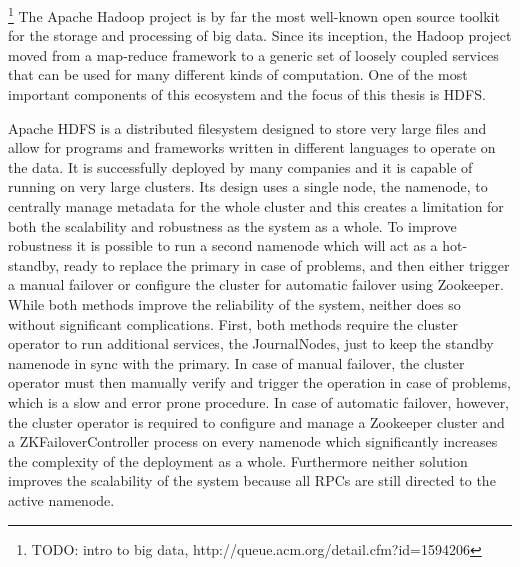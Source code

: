 \footnote{TODO: intro to big data, http://queue.acm.org/detail.cfm?id=1594206}
The Apache Hadoop project is by far the most well-known open source toolkit for the storage and processing of big data.
Since its inception, the Hadoop project moved from a map-reduce framework to a generic set of loosely coupled services that can be used for many different kinds of computation.
One of the most important components of this ecosystem and the focus of this thesis is HDFS.

Apache HDFS is a distributed filesystem designed to store very large files and allow for programs and frameworks written in different languages to operate on the data.
It is successfully deployed by many companies and it is capable of running on very large clusters.
Its design uses a single node, the namenode, to centrally manage metadata for the whole cluster and this creates a limitation for both the scalability and robustness as the system as a whole.
To improve robustness it is possible to run a second namenode which will act as a hot-standby, ready to replace the primary in case of problems, and then either trigger a manual failover or configure the cluster for automatic failover using Zookeeper.
While both methods improve the reliability of the system, neither does so without significant complications.
First, both methods require the cluster operator to run additional services, the JournalNodes, just to keep the standby namenode in sync with the primary.
In case of manual failover, the cluster operator must then manually verify and trigger the operation in case of problems, which is a slow and error prone procedure.
In case of automatic failover, however, the cluster operator is required to configure and manage a Zookeeper cluster and a ZKFailoverController process on every namenode which significantly increases the complexity of the deployment as a whole.
Furthermore neither solution improves the scalability of the system because all RPCs are still directed to the active namenode.


